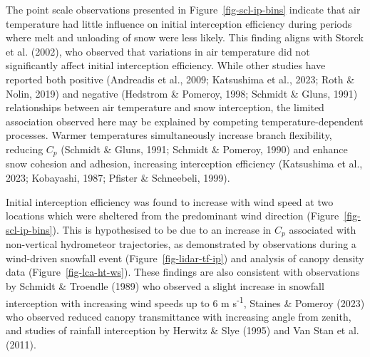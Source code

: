 \documentclass[
  letterpaper,
]{tex/uofsthesis-cs}
\begin{document}
The point scale observations presented in Figure~\ref{fig-scl-ip-bins}
indicate that air temperature had little influence on initial
interception efficiency during periods where melt and unloading of snow
were less likely. This finding aligns with Storck et al. (2002), who
observed that variations in air temperature did not significantly affect
initial interception efficiency. While other studies have reported both
positive (Andreadis et al., 2009; Katsushima et al., 2023; Roth \&
Nolin, 2019) and negative (Hedstrom \& Pomeroy, 1998; Schmidt \& Gluns,
1991) relationships between air temperature and snow interception, the
limited association observed here may be explained by competing
temperature-dependent processes. Warmer temperatures simultaneously
increase branch flexibility, reducing \(C_p\) (Schmidt \& Gluns, 1991;
Schmidt \& Pomeroy, 1990) and enhance snow cohesion and adhesion,
increasing interception efficiency (Katsushima et al., 2023; Kobayashi,
1987; Pfister \& Schneebeli, 1999).

Initial interception efficiency was found to increase with wind speed at
two locations which were sheltered from the predominant wind direction
(Figure~\ref{fig-scl-ip-bins}). This is hypothesised to be due to an
increase in \(C_p\) associated with non-vertical hydrometeor
trajectories, as demonstrated by observations during a wind-driven
snowfall event (Figure~\ref{fig-lidar-tf-ip}) and analysis of canopy
density data (Figure~\ref{fig-lca-ht-ws}). These findings are also
consistent with observations by Schmidt \& Troendle (1989) who observed
a slight increase in snowfall interception with increasing wind speeds
up to 6 m s\textsuperscript{-1}, Staines \& Pomeroy (2023) who observed
reduced canopy transmittance with increasing angle from zenith, and
studies of rainfall interception by Herwitz \& Slye (1995) and Van Stan
et al. (2011).
\end{document}
